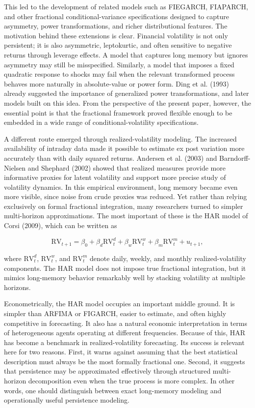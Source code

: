 \documentclass[12pt]{article}
\begin{document}
This led to the development of related models such as FIEGARCH, FIAPARCH, and other fractional conditional-variance specifications designed to capture asymmetry, power transformations, and richer distributional features. The motivation behind these extensions is clear. Financial volatility is not only persistent; it is also asymmetric, leptokurtic, and often sensitive to negative returns through leverage effects. A model that captures long memory but ignores asymmetry may still be misspecified. Similarly, a model that imposes a fixed quadratic response to shocks may fail when the relevant transformed process behaves more naturally in absolute-value or power form. Ding et al. (1993) already suggested the importance of generalized power transformations, and later models built on this idea. From the perspective of the present paper, however, the essential point is that the fractional framework proved flexible enough to be embedded in a wide range of conditional-volatility specifications.

A different route emerged through realized-volatility modeling. The increased availability of intraday data made it possible to estimate ex post variation more accurately than with daily squared returns. Andersen et al. (2003) and Barndorff-Nielsen and Shephard (2002) showed that realized measures provide more informative proxies for latent volatility and support more precise study of volatility dynamics. In this empirical environment, long memory became even more visible, since noise from crude proxies was reduced. Yet rather than relying exclusively on formal fractional integration, many researchers turned to simpler multi-horizon approximations. The most important of these is the HAR model of Corsi (2009), which can be written as

\[\mathrm{RV}_{t+1} = \beta_0 + \beta_d \mathrm{RV}_t^d + \beta_w \mathrm{RV}_t^w + \beta_m \mathrm{RV}_t^m + u_{t+1},\]

where $\mathrm{RV}_t^d$, $\mathrm{RV}_t^w$, and $\mathrm{RV}_t^m$ denote daily, weekly, and monthly realized-volatility components. The HAR model does not impose true fractional integration, but it mimics long-memory behavior remarkably well by stacking volatility at multiple horizons.

Econometrically, the HAR model occupies an important middle ground. It is simpler than ARFIMA or FIGARCH, easier to estimate, and often highly competitive in forecasting. It also has a natural economic interpretation in terms of heterogeneous agents operating at different frequencies. Because of this, HAR has become a benchmark in realized-volatility forecasting. Its success is relevant here for two reasons. First, it warns against assuming that the best statistical description must always be the most formally fractional one. Second, it suggests that persistence may be approximated effectively through structured multi-horizon decomposition even when the true process is more complex. In other words, one should distinguish between exact long-memory modeling and operationally useful persistence modeling.
\end{document}
